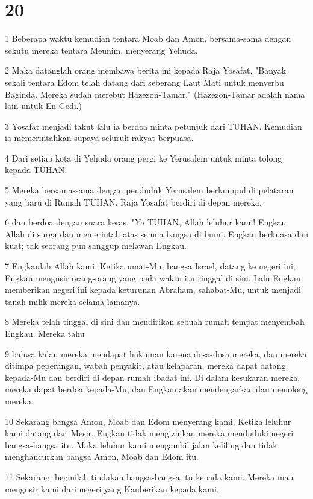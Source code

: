 \chapter{20}

\par 1 Beberapa waktu kemudian tentara Moab dan Amon, bersama-sama dengan sekutu mereka tentara Meunim, menyerang Yehuda.
\par 2 Maka datanglah orang membawa berita ini kepada Raja Yosafat, "Banyak sekali tentara Edom telah datang dari seberang Laut Mati untuk menyerbu Baginda. Mereka sudah merebut Hazezon-Tamar." (Hazezon-Tamar adalah nama lain untuk En-Gedi.)
\par 3 Yosafat menjadi takut lalu ia berdoa minta petunjuk dari TUHAN. Kemudian ia memerintahkan supaya seluruh rakyat berpuasa.
\par 4 Dari setiap kota di Yehuda orang pergi ke Yerusalem untuk minta tolong kepada TUHAN.
\par 5 Mereka bersama-sama dengan penduduk Yerusalem berkumpul di pelataran yang baru di Rumah TUHAN. Raja Yosafat berdiri di depan mereka,
\par 6 dan berdoa dengan suara keras, "Ya TUHAN, Allah leluhur kami! Engkau Allah di surga dan memerintah atas semua bangsa di bumi. Engkau berkuasa dan kuat; tak seorang pun sanggup melawan Engkau.
\par 7 Engkaulah Allah kami. Ketika umat-Mu, bangsa Israel, datang ke negeri ini, Engkau mengusir orang-orang yang pada waktu itu tinggal di sini. Lalu Engkau memberikan negeri ini kepada keturunan Abraham, sahabat-Mu, untuk menjadi tanah milik mereka selama-lamanya.
\par 8 Mereka telah tinggal di sini dan mendirikan sebuah rumah tempat menyembah Engkau. Mereka tahu
\par 9 bahwa kalau mereka mendapat hukuman karena dosa-dosa mereka, dan mereka ditimpa peperangan, wabah penyakit, atau kelaparan, mereka dapat datang kepada-Mu dan berdiri di depan rumah ibadat ini. Di dalam kesukaran mereka, mereka dapat berdoa kepada-Mu, dan Engkau akan mendengarkan dan menolong mereka.
\par 10 Sekarang bangsa Amon, Moab dan Edom menyerang kami. Ketika leluhur kami datang dari Mesir, Engkau tidak mengizinkan mereka menduduki negeri bangsa-bangsa itu. Maka leluhur kami mengambil jalan keliling dan tidak menghancurkan bangsa Amon, Moab dan Edom itu.
\par 11 Sekarang, beginilah tindakan bangsa-bangsa itu kepada kami. Mereka mau mengusir kami dari negeri yang Kauberikan kepada kami.
